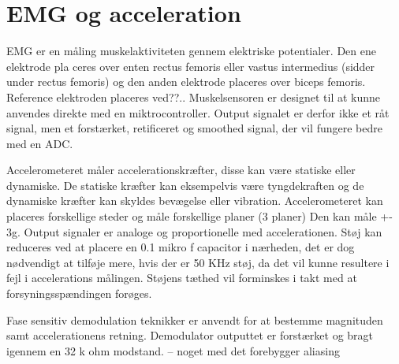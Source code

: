\section{EMG og acceleration}

EMG er en måling muskelaktiviteten gennem elektriske potentialer. Den ene elektrode pla
ceres over enten rectus femoris eller vastus intermedius (sidder under rectus femoris) og den anden elektrode placeres over biceps femoris. Reference elektroden placeres ved??.. 
Muskelsensoren er designet til at kunne anvendes direkte med en miktrocontroller. Output signalet er derfor ikke et råt signal, men et forstærket, retificeret og smoothed signal, der vil fungere bedre med en ADC. 


Accelerometeret måler accelerationskræfter, disse kan være statiske eller dynamiske. De statiske kræfter kan eksempelvis være tyngdekraften og de dynamiske kræfter kan skyldes bevægelse eller vibration. Accelerometeret kan placeres forskellige steder og måle forskellige planer (3 planer) 
Den kan måle +- 3g. Output signaler er analoge og proportionelle med accelerationen. Støj kan reduceres ved at placere en 0.1 mikro f capacitor i nærheden, det er dog nødvendigt at tilføje mere, hvis der er 50 KHz støj, da det vil kunne resultere i fejl i accelerations målingen. Støjens tæthed vil forminskes i takt med at forsyningsspændingen forøges. 


Fase sensitiv demodulation teknikker er anvendt for at bestemme magnituden samt accelerationens retning. Demodulator outputtet er forstærket og bragt igennem en 32 k ohm modstand. – noget med det forebygger aliasing 
